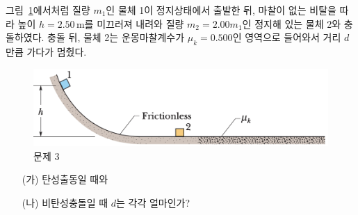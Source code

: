 \documentclass[floatfix,nofootinbib,superscriptaddress,fleqn]{revtex4-2}
\begin{document}
\vspace{1.cm}

그림~\ref{fig:3}에서처럼 질량 $m_1$인 물체 1이 정지상태에서 출발한 뒤,
마찰이 없는 비탈을 따라 높이 $h=2.50\,\mathrm{m}$를 미끄러져 내려와 
질량 $m_2=2.00m_1$인 정지해 있는 물체 2와 충돌하였다. 충돌 뒤, 물체
2는 운몽마찰계수가 $\mu_k=0.500$인 영역으로 들어와서 거리 $d$만큼
가다가 멈췄다. 
\begin{figure}[ht]
  \centering
\includegraphics[scale=0.5]{Qfig12-3-20210409.png}
  \caption{문제 3}
  \label{fig:3}
\end{figure}
\begin{itemize}
\item[(가)] 탄성출동일 때와
\item[(나)]  비탄성충돌일 때 $d$는 각각 얼마인가? 
\end{itemize}
\end{document}
